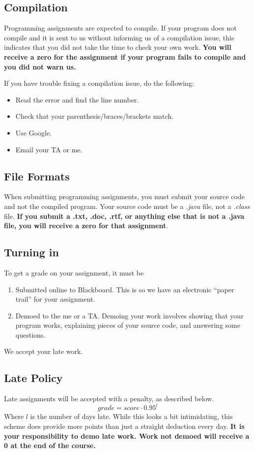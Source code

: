 \documentclass[10pt, letter]{article}
\begin{document}
\subsection*{Compilation}
Programming assignments are expected to compile.  If your program does not compile and it is sent to us without informing us of a compilation issue, this indicates that you did not take the time to check your own work.  \textbf{You will receive a zero for the assignment if your program fails to compile and you did not warn us.}

If you have trouble fixing a compilation issue, do the following:
{\footnotesize
	\begin{itemize}
		\item Read the error and find the line number.
		\item Check that your parenthesis/braces/brackets match.
		\item Use Google.
		\item Email your TA or me.
	\end{itemize}
}
\subsection*{File Formats}
When submitting programming assignments, you must submit your source code and not the compiled program.
Your source code must be a \emph{.java} file, not a \emph{.class} file.
\textbf{If you submit a .txt, .doc, .rtf, or anything else that is not a .java file, you will receive a zero for that assignment}.




\subsection*{Turning in}
To get a grade on your assignment, it must be 
\begin{enumerate}
	\item Submitted online to Blackboard.  This is so we have an electronic ``paper trail'' for your assignment.
	\item Demoed to the me or a TA.  Demoing your work involves showing that your program works, explaining pieces of your source code, and answering some questions.
\end{enumerate}

We accept your late work. 



\subsection*{Late Policy}
Late assignments will be accepted with a penalty, as described below.  $$grade = score \cdot 0.95^{l}$$
Where $l$ is the number of days late.  While this looks a bit intimidating, this scheme does provide more points than just a straight deduction every day. \textbf{It is your responsibility to demo late work.  Work not demoed will receive a 0 at the end of the course.}
\end{document}
